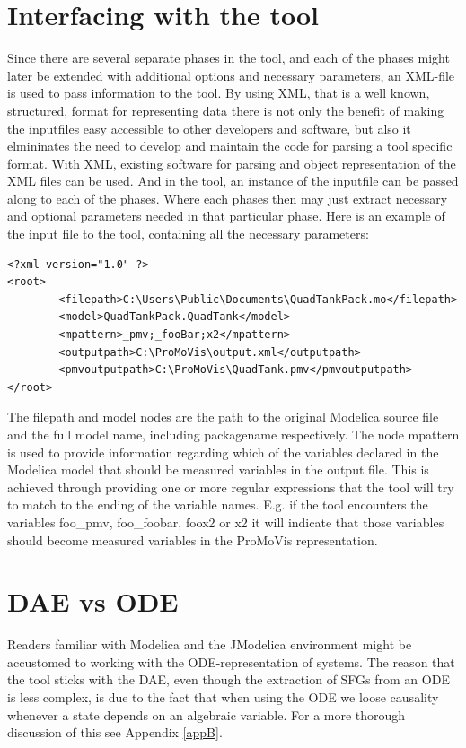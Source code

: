 \section{Interfacing with the tool}
Since there are several separate phases in the tool, and each of the phases might later be extended with additional options and necessary parameters, an XML-file is used to pass information to the tool. By using XML, that is a well known, structured, format for representing data there is not only the benefit of making the inputfiles easy accessible to other developers and software, but also it elmininates the need to develop and maintain the code for parsing a tool specific format. With XML, existing software for parsing and object representation of the XML files can be used. And in the tool, an instance of the inputfile can be passed along to each of the phases. Where each phases then may just extract necessary and optional parameters needed in that particular phase. Here is an example of the input file to the tool, containing all the necessary parameters:\lstset{language=XML}
\begin{lstlisting}
<?xml version="1.0" ?> 
<root>
        <filepath>C:\Users\Public\Documents\QuadTankPack.mo</filepath>
        <model>QuadTankPack.QuadTank</model>
        <mpattern>_pmv;_fooBar;x2</mpattern>
        <outputpath>C:\ProMoVis\output.xml</outputpath>
        <pmvoutputpath>C:\ProMoVis\QuadTank.pmv</pmvoutputpath>
</root>
\end{lstlisting}The filepath and model nodes are the path to the original Modelica source file and the full model name, including packagename respectively. The node mpattern is used to provide information regarding which of the variables declared in the Modelica model that should be measured variables in the output file. This is achieved through providing one or more regular expressions that the tool will try to match to the ending of the variable names. E.g. if the tool encounters the variables foo\_pmv, foo\_foobar, foox2 or x2 it will indicate that those variables should become measured variables in the ProMoVis representation.


\section{DAE vs ODE}
Readers familiar with Modelica and the JModelica environment might be accustomed to working with the ODE-representation of systems. The reason that the tool sticks with the DAE, even though the extraction of SFGs from an ODE is less complex, is due to the fact that when using the ODE we loose causality whenever a state depends on an algebraic variable. For a more thorough discussion of this see Appendix \ref{appB}.


